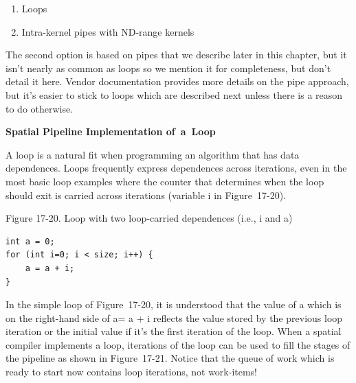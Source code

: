 \begin{enumerate}
	\item Loops
	\item Intra-kernel pipes with ND-range kernels
\end{enumerate}

The second option is based on pipes that we describe later in this chapter, but it isn’t nearly as common as loops so we mention it for completeness, but don’t detail it here. Vendor documentation provides more details on the pipe approach, but it’s easier to stick to loops which are described next unless there is a reason to do otherwise.\par

\hspace*{\fill} \par %
\textbf{Spatial Pipeline Implementation of a Loop}

A loop is a natural fit when programming an algorithm that has data dependences. Loops frequently express dependences across iterations, even in the most basic loop examples where the counter that determines when the loop should exit is carried across iterations (variable i in Figure 17-20).\par

\hspace*{\fill} \par %
Figure 17-20. Loop with two loop-carried dependences (i.e., i and a)
\begin{lstlisting}[caption={}]
int a = 0;
for (int i=0; i < size; i++) {
	a = a + i;
}
\end{lstlisting}

In the simple loop of Figure 17-20, it is understood that the value of a which is on the right-hand side of a= a + i reflects the value stored by the previous loop iteration or the initial value if it’s the first iteration of the loop. When a spatial compiler implements a loop, iterations of the loop can be used to fill the stages of the pipeline as shown in Figure 17-21. Notice that the queue of work which is ready to start now contains loop iterations, not work-items!\par

